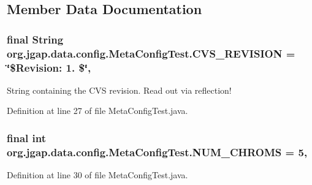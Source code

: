 \subsection{Member Data Documentation}
\hypertarget{classorg_1_1jgap_1_1data_1_1config_1_1_meta_config_test_aabf433ec816a5560c9973d231a0d58a4}{
\subsubsection[{C\-V\-S\-\_\-\-R\-E\-V\-I\-S\-I\-O\-N}]{\setlength{\rightskip}{0pt plus 5cm}final String org.\-jgap.\-data.\-config.\-Meta\-Config\-Test.\-C\-V\-S\-\_\-\-R\-E\-V\-I\-S\-I\-O\-N = \char`\"{}\$Revision\-: 1. \$\char`\"{}\hspace{0.3cm}{\ttfamily [static]}, {\ttfamily [private]}}}\label{classorg_1_1jgap_1_1data_1_1config_1_1_meta_config_test_aabf433ec816a5560c9973d231a0d58a4}
String containing the C\-V\-S revision. Read out via reflection! 

Definition at line 27 of file Meta\-Config\-Test.\-java.

\hypertarget{classorg_1_1jgap_1_1data_1_1config_1_1_meta_config_test_a5f2339c96b8059c05d76c2b32afef6fc}{
\subsubsection[{N\-U\-M\-\_\-\-C\-H\-R\-O\-M\-S}]{\setlength{\rightskip}{0pt plus 5cm}final int org.\-jgap.\-data.\-config.\-Meta\-Config\-Test.\-N\-U\-M\-\_\-\-C\-H\-R\-O\-M\-S = 5\hspace{0.3cm}{\ttfamily [static]}, {\ttfamily [private]}}}\label{classorg_1_1jgap_1_1data_1_1config_1_1_meta_config_test_a5f2339c96b8059c05d76c2b32afef6fc}


Definition at line 30 of file Meta\-Config\-Test.\-java.

